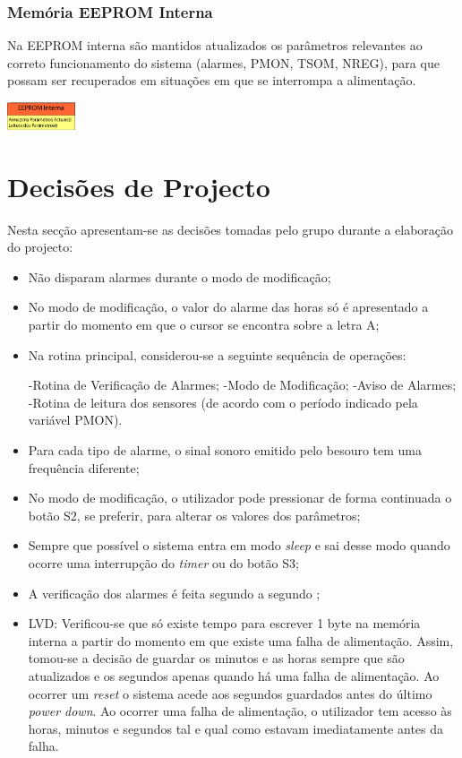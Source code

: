 \documentclass{article}
\begin{document}
		\subsubsection{Memória EEPROM Interna}
		Na EEPROM interna são mantidos atualizados os parâmetros relevantes ao correto funcionamento do sistema (alarmes, PMON, TSOM, NREG), para que possam ser recuperados em situações em que se interrompa a alimentação.
		
	
		\begin{center}
			\includegraphics[width=0.15\textwidth]{scereport_14}
		\end{center}
		
		\section{Decisões de Projecto}
		Nesta secção apresentam-se as decisões tomadas pelo grupo durante a elaboração do projecto:
		
		\begin{itemize}
		\item Não disparam alarmes durante o modo de modificação;
		\item No modo de modificação, o valor do alarme das horas só é apresentado a partir do momento em que o cursor se encontra sobre a letra A;
		\item Na rotina principal, considerou-se a seguinte sequência de operações:
		
			\subitem -Rotina de Verificação de Alarmes;
			\subitem -Modo de Modificação;
			\subitem -Aviso de Alarmes;
			\subitem -Rotina de leitura dos sensores (de acordo com o período indicado pela variável PMON).
		\item Para cada tipo de alarme, o sinal sonoro emitido pelo besouro tem uma frequência diferente; 
		\item No modo de modificação, o utilizador pode pressionar de forma continuada o botão S2, se preferir, para alterar os valores dos parâmetros;
		\item Sempre que possível o sistema entra em modo \textit{sleep} e sai desse modo quando ocorre uma interrupção do \textit{timer} ou do botão S3;
		\item A verificação dos alarmes é feita segundo a segundo ;
		\item LVD:
			\subitem Verificou-se que só existe tempo para escrever 1 byte na memória interna a partir do momento em que existe uma falha de alimentação. Assim, tomou-se a decisão de guardar os minutos e as horas sempre que são atualizados e os segundos apenas quando há uma falha de alimentação. Ao ocorrer um \textit{reset} o sistema acede aos segundos guardados antes do último \textit{power down}. Ao ocorrer uma falha de alimentação, o utilizador tem acesso às horas, minutos e segundos tal e qual como estavam imediatamente antes da falha.
		
		\end{itemize}
		
\end{document}
